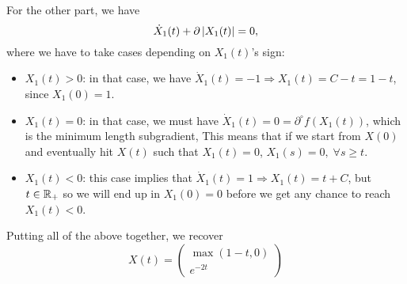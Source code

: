 \documentclass[10pt]{article}
\begin{document}
\begin{Exercise}
\[        \]
        For the other part, we have
        \[
            \dot{X}_1(t) + \partial \left| X_1(t) \right| = 0,
        \]
        where we have to take cases depending on $X_1(t)$'s sign:
        \begin{itemize}
        \item $X_1(t) > 0$: in that case, we have $\dot{X}_1(t) = -1 \Rightarrow
            X_1(t) = C - t = 1 - t$, since $X_1(0) = 1$.
        \item $X_1(t) = 0$: in that case, we must have $\dot{X}_1(t) =
            0 = \partial^{\circ} f(X_1(t))$, which is the minimum length
            subgradient, This means that if we start from $X(0)$ and eventually
            hit $X(t)$ such that $X_1(t) = 0$, $X_1(s) = 0, \; \forall s \geq
            t$.
        \item $X_1(t) < 0$: this case implies that
            $\dot{X}_1(t) = 1 \Rightarrow X_1(t) = t + C$, but $t \in \mathbb{R}_+$
            so we will end up in $X_1(0) = 0$ before we get any chance to reach
            $X_1(t) < 0$.
        \end{itemize}
        Putting all of the above together, we recover
        \[
            X(t) = \begin{pmatrix}
                    \max(1 - t, 0) \\
                    e^{-2t}
                \end{pmatrix}
        \]


\end{Exercise}
\end{document}
